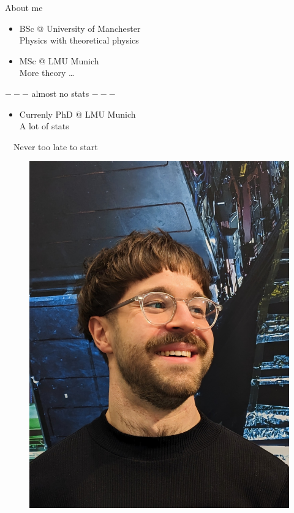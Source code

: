 \documentclass[
aspectratio=169,
14pt,
professionalfonts
]{beamer}
\newcommand{\arrow}{~\ding{220}~}
\begin{document}
\begin{frame}{About me}
    \begin{minipage}{0.69\textwidth}
        \begin{itemize}
            \item BSc @ University of Manchester \\
                Physics with theoretical physics\\
            \item MSc @ LMU Munich \\
                More theory \ldots
        \end{itemize}
        $---$ almost no stats $---$
        \begin{itemize}
            \item Currenly PhD @ LMU Munich\\
                A lot of stats
        \end{itemize}
        \arrow Never too late to start
    \end{minipage}
    \begin{minipage}{0.3\textwidth}
        \begin{figure}
            \center
            \includegraphics[width=\textwidth]{../plots/port.jpg}
        \end{figure}
    \end{minipage}
\end{frame}
\end{document}
